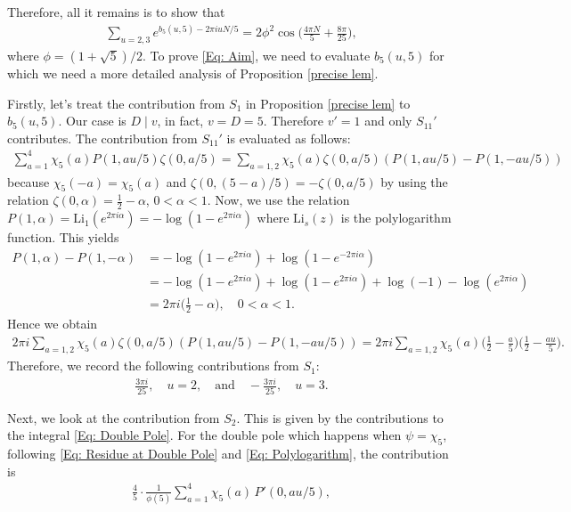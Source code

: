 \documentclass[11pt]{amsart}
\numberwithin{equation}{section}
\theoremstyle{remark}
\begin{document}
Therefore, all it remains is to show that
\begin{align}\label{Eq: Aim}
\sum_{u=2,3}e^{b_5(u,5)-2\pi i uN/5}=2\phi^2\cos\bigg(\frac{4\pi N}{5}+\frac{8\pi}{25}\bigg),
\end{align}
where $\phi = (1+\sqrt{5})/2.$ To prove \eqref{Eq: Aim}, we need to evaluate $b_5(u,5)$ for which we need a more detailed analysis of Proposition \ref{precise lem}.
\par
Firstly, let's treat the contribution from $S_1$ in Proposition \ref{precise lem} to $b_5(u,5)$. Our case is $D \mid v$, in fact, $v=D=5$. Therefore $v'=1$ and only $S_{11}'$ contributes. The contribution from $S_{11}'$ is evaluated as follows:
\begin{align*}
\sum_{a=1}^{4} \chi_5(a)P(1,au/5)\zeta(0,a/5) = \sum_{a=1,2} \chi_5(a) \zeta(0,a/5) (P(1,au/5)-P(1,-au/5))
\end{align*}
because $\chi_5(-a)=\chi_5(a)$ and $\zeta(0,(5-a)/5)=-\zeta(0,a/5)$ by using the relation $\zeta(0,\alpha) = \tfrac{1}{2}-\alpha$, $0<\alpha<1$. Now, we use the relation $P(1,\alpha) =\textrm{Li}_1(e^{2 \pi i \alpha}) = -\log(1-e^{2\pi i \alpha})$ where $\textrm{Li}_s(z)$ is the polylogarithm function. This yields
\begin{align*}
P(1,\alpha) - P(1,-\alpha) &= -\log(1-e^{2\pi i \alpha})+\log(1-e^{-2\pi i \alpha}) \\
&= -\log(1-e^{2\pi i \alpha})+\log(1-e^{2\pi i \alpha})+\log(-1)-\log(e^{2\pi i \alpha})\\
&=2 \pi i \bigg(\frac{1}{2}-\alpha\bigg), \quad 0<\alpha<1.
\end{align*} 
Hence we obtain
\begin{align*}
2 \pi i \sum_{a=1,2} \chi_5(a) \zeta(0,a/5) (P(1,au/5)-P(1,-au/5)) = 2 \pi i\sum_{a=1,2} \chi_5(a) \bigg(\frac{1}{2}-\frac{a}{5} \bigg)\bigg(\frac{1}{2} -\frac{au}{5} \bigg).
\end{align*}
Therefore, we record the following contributions from $S_1$:
\begin{align}\label{Contribution 1}
\frac{3\pi i}{25}, \quad u=2, \quad \textrm{and} \quad -\frac{3\pi i}{25}, \quad u =3.
\end{align}
\par
Next, we look at the contribution from $S_2$. This is given by the contributions to the integral \eqref{Eq: Double Pole}. For the double pole which happens when $\psi = \chi_5$, following \eqref{Eq: Residue at Double Pole} and \eqref{Eq: Polylogarithm},
the contribution is
\begin{align*}
    \frac{4}{5} \cdot \frac{1}{\phi(5)} \sum_{a=1}^{4} \chi_5(a)\, P'(0,au/5),
\end{align*}
\end{document}

